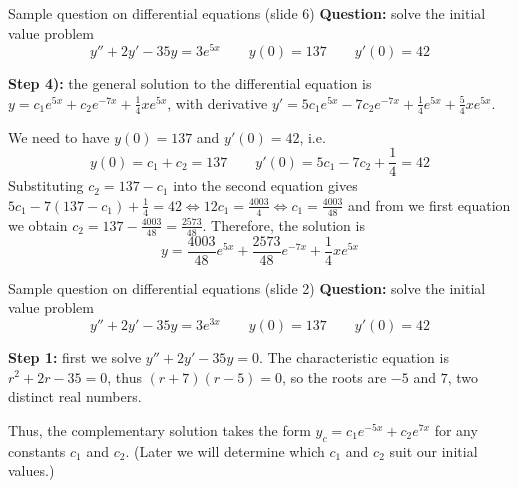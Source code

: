 \begin{frame}{Sample question on differential equations (slide 6)}
    \textbf{Question:} solve the initial value problem \[y''+2y'-35y=3e^{5x}\qquad y(0)=137\qquad y'(0)=42\]
    
    \textbf{Step 4):} the general solution to the differential equation is
    $y=c_1e^{5x} + c_2e^{-7x} +\frac{1}{4}xe^{5x}$\pause, with derivative $y'=5c_1e^{5x}-7c_2e^{-7x}+\frac{1}{4}e^{5x}+\frac{5}{4}xe^{5x}$.

    We need to have $y(0)=137$ and $y'(0)=42$\pause, i.e.
    \[y(0)=c_1+c_2=137\qquad y'(0)=5c_1-7c_2+\frac{1}{4}=42\]\pause
    Substituting $c_2=137-c_1$ into the second equation gives $5c_1-7(137-c_1)+\frac{1}{4}=42 \iff 12c_1=\frac{4003}{4} \iff c_1=\frac{4003}{48}$ and from we first equation we obtain $c_2=137-\frac{4003}{48}=\frac{2573}{48}$. Therefore, the solution is \[\boxed{\boxed{y=\frac{4003}{48}e^{5x} + \frac{2573}{48}e^{-7x} +\frac{1}{4}xe^{5x}}}\]

    

\end{frame}









































\iffalse

\begin{frame}{Sample question on differential equations (slide 2)}
    \textbf{Question:} solve the initial value problem \[y''+2y'-35y=3e^{3x}\qquad y(0)=137\qquad y'(0)=42\]
    
    \textbf{Step 1:} first we solve $y''+2y'-35y=0$. The characteristic equation is $r^2+2r-35=0$, thus $(r+7)(r-5)=0$, so the roots are $-5$ and $7$, two distinct real numbers.

    Thus, the complementary solution takes the form $y_c = c_1e^{-5x} + c_2e^{7x}$ for any constants $c_1$ and $c_2$. (Later we will determine which $c_1$ and $c_2$ suit our initial values.)
\end{frame}

